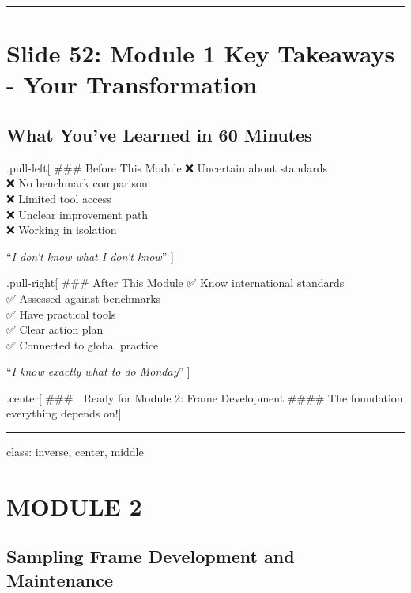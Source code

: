 \documentclass[
]{article}
\begin{document}
\begin{center}\rule{0.5\linewidth}{0.5pt}\end{center}

\section{Slide 52: Module 1 Key Takeaways - Your
Transformation}\label{slide-52-module-1-key-takeaways---your-transformation}

\subsection{What You've Learned in 60
Minutes}\label{what-youve-learned-in-60-minutes}

.pull-left{[} \#\#\# Before This Module ❌ Uncertain about standards\\
❌ No benchmark comparison\\
❌ Limited tool access\\
❌ Unclear improvement path\\
❌ Working in isolation

``\emph{I don't know what I don't know}'' {]}

.pull-right{[} \#\#\# After This Module ✅ Know international
standards\\
✅ Assessed against benchmarks\\
✅ Have practical tools\\
✅ Clear action plan\\
✅ Connected to global practice

``\emph{I know exactly what to do Monday}'' {]}

.center{[} \#\#\# 🎯 Ready for Module 2: Frame Development \#\#\#\# The
foundation everything depends on!{]}

\begin{center}\rule{0.5\linewidth}{0.5pt}\end{center}

class: inverse, center, middle

\section{MODULE 2}\label{module-2}

\subsection{Sampling Frame Development and
Maintenance}\label{sampling-frame-development-and-maintenance}
\end{document}
